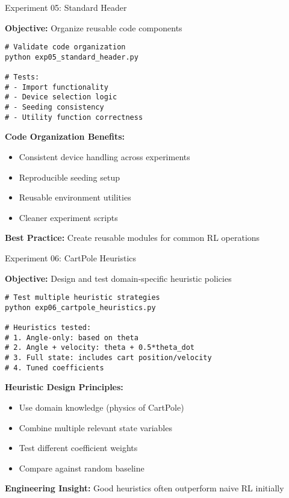 \documentclass[aspectratio=169,10pt]{beamer}
\begin{document}
\begin{frame}[fragile]{Experiment 05: Standard Header}

\textbf{Objective:} Organize reusable code components

\begin{lstlisting}
# Validate code organization
python exp05_standard_header.py

# Tests:
# - Import functionality
# - Device selection logic
# - Seeding consistency
# - Utility function correctness
\end{lstlisting}

\vfill

\textbf{Code Organization Benefits:}
\begin{itemize}
    \item Consistent device handling across experiments
    \item Reproducible seeding setup
    \item Reusable environment utilities
    \item Cleaner experiment scripts
\end{itemize}

\vfill

\textbf{Best Practice:} Create reusable modules for common RL operations

\end{frame}

\begin{frame}[fragile]{Experiment 06: CartPole Heuristics}

\textbf{Objective:} Design and test domain-specific heuristic policies

\begin{lstlisting}
# Test multiple heuristic strategies
python exp06_cartpole_heuristics.py

# Heuristics tested:
# 1. Angle-only: based on theta
# 2. Angle + velocity: theta + 0.5*theta_dot  
# 3. Full state: includes cart position/velocity
# 4. Tuned coefficients
\end{lstlisting}

\vfill

\textbf{Heuristic Design Principles:}
\begin{itemize}
    \item Use domain knowledge (physics of CartPole)
    \item Combine multiple relevant state variables
    \item Test different coefficient weights
    \item Compare against random baseline
\end{itemize}

\vfill

\textbf{Engineering Insight:} Good heuristics often outperform naive RL initially

\end{frame}
\end{document}
